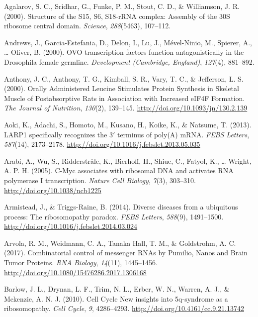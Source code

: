 \documentclass[12pt,twoside]{reedthesis}
\newlength{\cslhangindent}
\newenvironment{cslreferences}%
  {\setlength{\parindent}{0pt}%
  \everypar{\setlength{\hangindent}{\cslhangindent}}\ignorespaces}%
  {\par}
\begin{document}
\hypertarget{refs}{}
\begin{cslreferences}
\leavevmode\hypertarget{ref-Agalarov2000}{}%
Agalarov, S. C., Sridhar, G., Funke, P. M., Stout, C. D., \& Williamson, J. R. (2000). Structure of the S15, S6, S18-rRNA complex: Assembly of the 30S ribosome central domain. \emph{Science}, \emph{288}(5463), 107--112.

\leavevmode\hypertarget{ref-Andrews2000a}{}%
Andrews, J., Garcia-Estefania, D., Delon, I., Lu, J., Mével-Ninio, M., Spierer, A., \ldots{} Oliver, B. (2000). OVO transcription factors function antagonistically in the Drosophila female germline. \emph{Development (Cambridge, England)}, \emph{127}(4), 881--892.

\leavevmode\hypertarget{ref-anthonyOrallyAdministeredLeucine2000}{}%
Anthony, J. C., Anthony, T. G., Kimball, S. R., Vary, T. C., \& Jefferson, L. S. (2000). Orally Administered Leucine Stimulates Protein Synthesis in Skeletal Muscle of Postabsorptive Rats in Association with Increased eIF4F Formation. \emph{The Journal of Nutrition}, \emph{130}(2), 139--145. \url{http://doi.org/10.1093/jn/130.2.139}

\leavevmode\hypertarget{ref-aokiLARP1SpecificallyRecognizes2013}{}%
Aoki, K., Adachi, S., Homoto, M., Kusano, H., Koike, K., \& Natsume, T. (2013). LARP1 specifically recognizes the 3\({'}\) terminus of poly(A) mRNA. \emph{FEBS Letters}, \emph{587}(14), 2173--2178. \url{http://doi.org/10.1016/j.febslet.2013.05.035}

\leavevmode\hypertarget{ref-arabiCMycAssociatesRibosomal2005}{}%
Arabi, A., Wu, S., Ridderstråle, K., Bierhoff, H., Shiue, C., Fatyol, K., \ldots{} Wright, A. P. H. (2005). C-Myc associates with ribosomal DNA and activates RNA polymerase I transcription. \emph{Nature Cell Biology}, \emph{7}(3), 303--310. \url{http://doi.org/10.1038/ncb1225}

\leavevmode\hypertarget{ref-Armistead2014a}{}%
Armistead, J., \& Triggs-Raine, B. (2014). Diverse diseases from a ubiquitous process: The ribosomopathy paradox. \emph{FEBS Letters}, \emph{588}(9), 1491--1500. \url{http://doi.org/10.1016/j.febslet.2014.03.024}

\leavevmode\hypertarget{ref-Arvola2017n}{}%
Arvola, R. M., Weidmann, C. A., Tanaka Hall, T. M., \& Goldstrohm, A. C. (2017). Combinatorial control of messenger RNAs by Pumilio, Nanos and Brain Tumor Proteins. \emph{RNA Biology}, \emph{14}(11), 1445--1456. \url{http://doi.org/10.1080/15476286.2017.1306168}

\leavevmode\hypertarget{ref-Barlow2010a}{}%
Barlow, J. L., Drynan, L. F., Trim, N. L., Erber, W. N., Warren, A. J., \& Mckenzie, A. N. J. (2010). Cell Cycle New insights into 5q-syndrome as a ribosomopathy. \emph{Cell Cycle}, \emph{9}, 4286--4293. \url{http://doi.org/10.4161/cc.9.21.13742}


\end{cslreferences}
\end{document}
